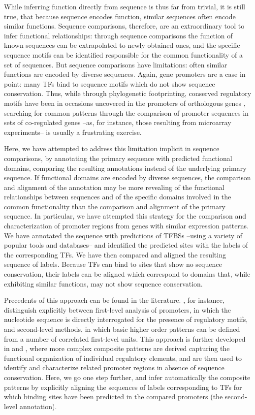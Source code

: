 While inferring function directly from sequence is thus far from
trivial, it is still true, that because sequence encodes function, 
similar sequences often encode similar functions. Sequence comparisons,
therefore, are an extraordinary tool to infer functional relationships: 
through sequence comparisons the function of known sequences can be 
extrapolated to newly obtained ones, and the specific sequence motifs 
can be identified responsible for the common functionality of a set of
sequences. But sequence comparisons have limitations: often
similar functions are encoded by diverse sequences. Again,
gene promoters are a case in point: many TFs bind to
sequence motifs which do not show sequence conservation. Thus, while
through phylogenetic footprinting, conserved regulatory motifs have
been in occasions uncovered in the promoters of orthologous genes
\citep{blanchette:2002a,lenhard:2003a}, searching for common patterns through the comparison of
promoter sequences in sets of co-regulated genes --as, for instance,
those resulting from microarray experiments-- is usually a frustrating
exercise. 

Here, we have attempted to address this limitation implicit in sequence
comparisons, by annotating the primary sequence with predicted
functional domains, comparing the resulting annotations instead of the
underlying primary sequence. If functional domains are encoded by
diverse sequences, the comparison and alignment of the annotation may
be more revealing of the functional relationships between sequences
and of the specific domains involved in the common functionality than
the comparison and alignment of the primary sequence. In particular,
we have attempted this strategy for the comparison and
characterization of promoter regions from genes with similar
expression patterns. We have annotated the sequence with predictions
of TFBSs --using a variety of popular tools and databases-- and identified 
the predicted sites with the labels of the corresponding TFs. We have then
compared and aligned the resulting sequence of labels. Because TFs can
bind to sites that show no sequence conservation, their labels can be
aligned which correspond to domains that, while exhibiting similar
functions, may not show sequence conservation. 

Precedents of this approach can be found in the literature.
\citep{quandt:1996a}, for instance, distinguish explicitly between
first-level analysis of promoters, in which the nucleotide sequence
is directly interrogated for the presence of regulatory motifs, and
second-level methods, in which basic higher order patterns can be
defined from a number of correlated first-level units. This
approach is further developed in \citep{frech:1997a} and
\citep{klingenhoff:1999a}, where more complex composite patterns are derived
capturing the functional organization of individual regulatory elements,
and are then used to identify and characterize related promoter
regions in absence of sequence conservation. 
Here, we go one step further, and infer automatically the composite patterns by
explicitly aligning the sequences of labels corresponding to TFs for
which binding sites have been predicted in the compared promoters (the
second-level annotation).

